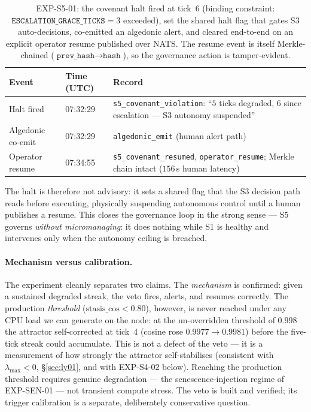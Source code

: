 \documentclass[11pt, a4paper]{article}
\begin{document}
\begin{table}[!htb]
\centering
\small
\begin{tabular}{lll}
\toprule
Event & Time (UTC) & Record \\
\midrule
Halt fired           & 07:32:29 & \texttt{s5\_covenant\_violation}: ``$5$ ticks degraded,
                                   $6$ since escalation --- S3 autonomy suspended'' \\
Algedonic co-emit    & 07:32:29 & \texttt{algedonic\_emit} (human alert path) \\
Operator resume      & 07:34:55 & \texttt{s5\_covenant\_resumed}, \texttt{operator\_resume};
                                   Merkle chain intact ($156$\,s human latency) \\
\bottomrule
\end{tabular}
\caption{EXP-S5-01: the covenant halt fired at tick~6 (binding constraint:
$\texttt{ESCALATION\_GRACE\_TICKS}=3$ exceeded), set the shared halt flag that gates
S3 auto-decisions, co-emitted an algedonic alert, and cleared end-to-end on an
explicit operator resume published over NATS. The resume event is itself
Merkle-chained ($\texttt{prev\_hash}\to\texttt{hash}$), so the governance action is
tamper-evident.}
\label{tab:s5veto}
\end{table}

The halt is therefore not advisory: it sets a shared flag that the S3 decision path
reads before executing, physically suspending autonomous control until a human
publishes a resume. This closes the governance loop in the strong sense --- S5
governs \emph{without micromanaging}: it does nothing while S1 is healthy and
intervenes only when the autonomy ceiling is breached.

\paragraph{Mechanism versus calibration.} The experiment cleanly separates two
claims. The \emph{mechanism} is confirmed: given a sustained degraded streak, the
veto fires, alerts, and resumes correctly. The production \emph{threshold}
($\text{stasis\_cos} < 0.80$), however, is never reached under any CPU load we can
generate on the node: at the un-overridden threshold of $0.998$ the attractor
self-corrected at tick~4 (cosine rose $0.9977 \to 0.9981$) before the five-tick
streak could accumulate. This is not a defect of the veto --- it is a measurement of
how strongly the attractor self-stabilises (consistent with $\lambda_\text{max}<0$,
\S\ref{sec:ly01}, and with EXP-S4-02 below). Reaching the production threshold
requires genuine degradation --- the senescence-injection regime of EXP-SEN-01 --- not
transient compute stress. The veto is built and verified; its trigger calibration is
a separate, deliberately conservative question.
\end{document}
